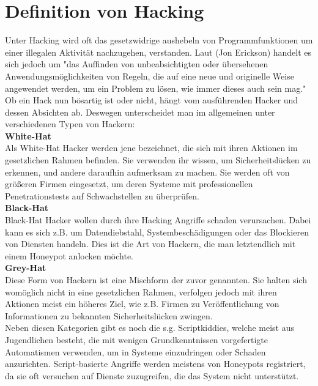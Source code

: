 \section{Definition von Hacking}
Unter Hacking wird oft das gesetzwidrige aushebeln von Programmfunktionen um einer illegalen Aktivität nachzugehen, verstanden. Laut (Jon Erickson) handelt es sich jedoch um "das Auffinden von unbeabsichtigten oder übersehenen Anwendungsmöglichkeiten von Regeln, die auf eine neue und originelle Weise angewendet werden, um ein Problem zu lösen, wie immer dieses auch sein mag." 
Ob ein Hack nun bösartig ist oder nicht, hängt vom ausführenden Hacker und dessen Absichten ab. Deswegen unterscheidet man im allgemeinen unter verschiedenen Typen von Hackern\cite{erickson.2009a}:\\

\noindent\textbf{White-Hat}\\
Als White-Hat Hacker werden jene bezeichnet, die sich mit ihren Aktionen im gesetzlichen Rahmen befinden. Sie verwenden ihr wissen, um Sicherheitslücken zu erkennen, und andere daraufhin aufmerksam zu machen. Sie werden oft von größeren Firmen eingesetzt, um deren Systeme mit professionellen Penetrationstests auf Schwachstellen zu überprüfen. \\

\noindent\textbf{Black-Hat}\\
Black-Hat Hacker wollen durch ihre Hacking Angriffe schaden verursachen. Dabei kann es sich z.B. um Datendiebstahl, Systembeschädigungen oder das Blockieren von Diensten handeln. Dies ist die Art von Hackern, die man letztendlich mit einem Honeypot anlocken möchte.\\

\noindent\textbf{Grey-Hat}\\
Diese Form von Hackern ist eine Mischform der zuvor genannten. Sie halten sich womöglich nicht in eine gesetzlichen Rahmen, verfolgen jedoch mit ihren Aktionen meist ein höheres Ziel, wie z.B. Firmen zu Veröffentlichung von Informationen zu bekannten Sicherheitslücken zwingen.\\

Neben diesen Kategorien gibt es noch die s.g. Scriptkiddies, welche meist aus Jugendlichen besteht, die mit wenigen Grundkenntnissen vorgefertigte Automatismen verwenden, um in Systeme einzudringen oder Schaden anzurichten. Script-basierte Angriffe werden meistens von Honeypots registriert, da sie oft versuchen auf Dienste zuzugreifen, die das System nicht unterstützt.